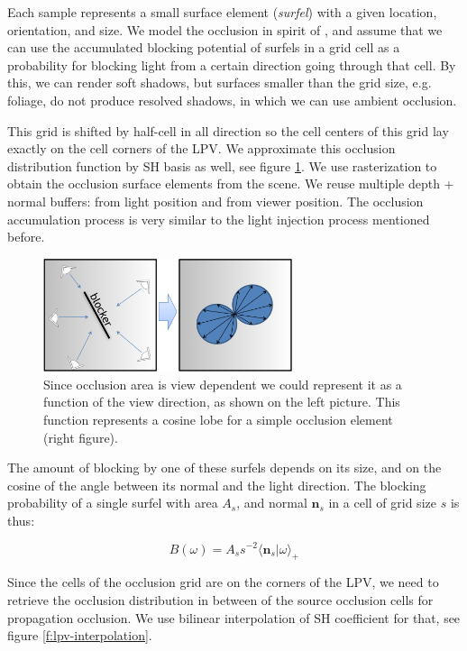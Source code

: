 Each sample represents a small surface element (\textit{surfel}) with a given location, orientation, and size. We model the occlusion in spirit of \cite{a:AUnifiedHierarchicalAlgorithmforGlobalIlluminationwithScatteringVolumesandObjectClusters}, and assume that we can use the accumulated blocking potential of surfels in a grid cell as a probability for blocking light from a certain direction going through that cell. By this, we can render soft shadows, but surfaces smaller than the grid size, e.g. foliage, do not produce resolved shadows, in which we can use ambient occlusion.

This grid is shifted by half-cell in all direction so the cell centers of this grid lay exactly on the cell corners of the LPV. We approximate this occlusion distribution function by SH basis as well, see figure \ref{f:lpv-occlusion-grid}. We use rasterization to obtain the occlusion surface elements from the scene. We reuse multiple depth + normal buffers: from light position and from viewer position. The occlusion accumulation process is very similar to the light injection process mentioned before. 

\begin{figure}
\sidecaption
	\includegraphics[width=0.65\textwidth]{graphics/lpv/lpv-5-1}
	\caption{Since occlusion area is view dependent we could represent it as a function of the view direction, as shown on the left picture. This function represents a cosine lobe for a simple occlusion element (right figure).}
	\label{f:lpv-occlusion-grid}
\end{figure}

The amount of blocking by one of these surfels depends on its size, and on the cosine of the angle between its normal and the light direction. The blocking probability of a single surfel with area $A_s$, and normal $\mathbf{n}_s$ in a cell of grid size $s$ is thus:

\begin{equation*}
	B(\omega)=A_s s^{-2}\langle \mathbf{n}_s|\omega\rangle _+
\end{equation*} 

Since the cells of the occlusion grid are on the corners of the LPV, we need to retrieve the occlusion distribution in between of the source occlusion cells for propagation occlusion. We use bilinear interpolation of SH coefficient for that, see figure \ref{f:lpv-interpolation}.


